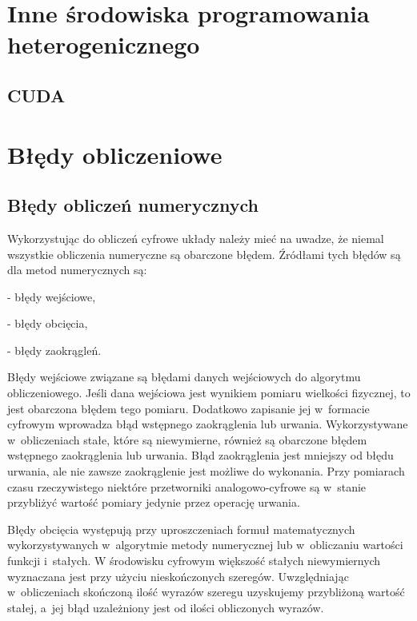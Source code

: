 
\section{Inne środowiska programowania heterogenicznego}\label{sec:others}

\subsection{CUDA}\label{sec:cuda}

\section{Błędy obliczeniowe}\label{sec:errors}

\subsection{Błędy obliczeń numerycznych}\label{sec:numerr}

Wykorzystując do obliczeń cyfrowe układy należy mieć na uwadze, że niemal wszystkie obliczenia numeryczne są obarczone błędem. Źródłami tych błędów są dla metod numerycznych są:

- błędy wejściowe,

- błędy obcięcia,

- błędy zaokrągleń.

Błędy wejściowe związane są błędami danych wejściowych do algorytmu obliczeniowego. Jeśli dana wejściowa jest wynikiem pomiaru wielkości fizycznej, to jest obarczona błędem tego pomiaru. Dodatkowo zapisanie jej w~formacie cyfrowym wprowadza błąd wstępnego zaokrąglenia lub urwania. Wykorzystywane w~obliczeniach stałe, które są niewymierne, również są obarczone błędem wstępnego zaokrąglenia lub urwania. Błąd zaokrąglenia jest mniejszy od błędu urwania, ale nie zawsze zaokrąglenie jest możliwe do wykonania. Przy pomiarach czasu rzeczywistego niektóre przetworniki analogowo-cyfrowe są w~stanie przybliżyć wartość pomiary jedynie przez operację urwania.

Błędy obcięcia występują przy uproszczeniach formuł matematycznych wykorzystywanych w~algorytmie metody numerycznej lub w~obliczaniu wartości funkcji i~stałych. W środowisku cyfrowym większość stałych niewymiernych wyznaczana jest przy użyciu nieskończonych szeregów. Uwzględniając w~obliczeniach skończoną ilość wyrazów szeregu uzyskujemy przybliżoną wartość stałej, a~jej błąd uzależniony jest od ilości obliczonych wyrazów.

